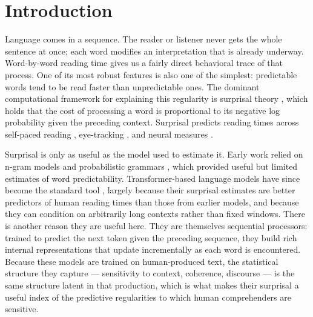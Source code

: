 \documentclass[12pt]{article}
\begin{document}
\newpage

\section{Introduction}

Language comes in a sequence. The reader or listener never gets the whole sentence at once; each word modifies an interpretation that is already underway. Word-by-word reading time gives us a fairly direct behavioral trace of that process. One of its most robust features is also one of the simplest: predictable words tend to be read faster than unpredictable ones. The dominant computational framework for explaining this regularity is surprisal theory \citep{hale2001,levy2008}, which holds that the cost of processing a word is proportional to its negative log probability given the preceding context. %
Surprisal predicts reading times across self-paced reading \citep{smith2013}, eye-tracking \citep{demberg2008}, and neural measures \citep{frank2015}.

Surprisal is only as useful as the model used to estimate it. Early work relied on n-gram models and probabilistic grammars \citep{hale2001,demberg2008,roark2009}, which provided useful but limited estimates of word predictability. Transformer-based language models have since become the standard tool \citep{goodkind2018,wilcox2020,schrimpf2021}, largely because their surprisal estimates are better predictors of human reading times than those from earlier models, and because they can condition on arbitrarily long contexts rather than fixed windows. There is another reason they are useful here. They are themselves sequential processors: trained to predict the next token given the preceding sequence, they build rich internal representations that update incrementally as each word is encountered. Because these models are trained on human-produced text, the statistical structure they capture --- sensitivity to context, coherence, discourse --- is the same structure latent in that production, which is what makes their surprisal a useful index of the predictive regularities to which human comprehenders are sensitive.
\end{document}
